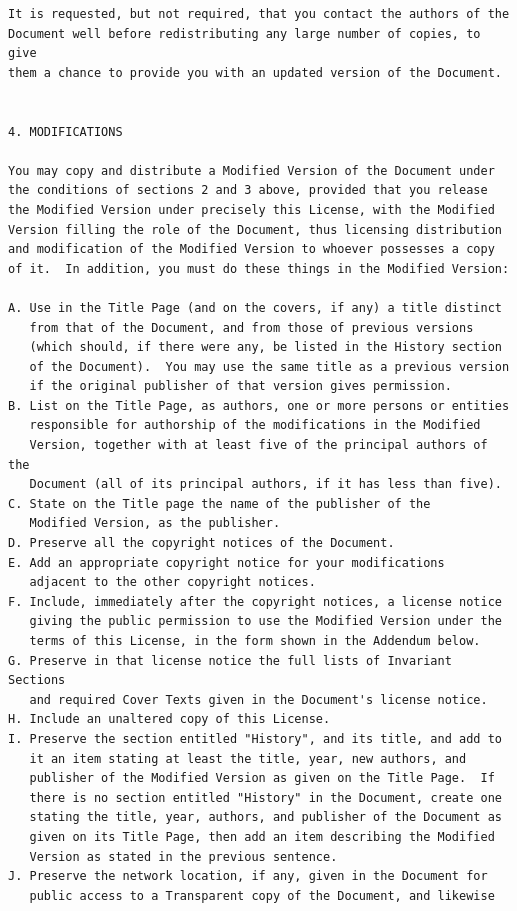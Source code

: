 \documentclass[12pt]{report}
\begin{document}
\begin{verbatim}
It is requested, but not required, that you contact the authors of the
Document well before redistributing any large number of copies, to give
them a chance to provide you with an updated version of the Document.


4. MODIFICATIONS

You may copy and distribute a Modified Version of the Document under
the conditions of sections 2 and 3 above, provided that you release
the Modified Version under precisely this License, with the Modified
Version filling the role of the Document, thus licensing distribution
and modification of the Modified Version to whoever possesses a copy
of it.  In addition, you must do these things in the Modified Version:

A. Use in the Title Page (and on the covers, if any) a title distinct
   from that of the Document, and from those of previous versions
   (which should, if there were any, be listed in the History section
   of the Document).  You may use the same title as a previous version
   if the original publisher of that version gives permission.
B. List on the Title Page, as authors, one or more persons or entities
   responsible for authorship of the modifications in the Modified
   Version, together with at least five of the principal authors of the
   Document (all of its principal authors, if it has less than five).
C. State on the Title page the name of the publisher of the
   Modified Version, as the publisher.
D. Preserve all the copyright notices of the Document.
E. Add an appropriate copyright notice for your modifications
   adjacent to the other copyright notices.
F. Include, immediately after the copyright notices, a license notice
   giving the public permission to use the Modified Version under the
   terms of this License, in the form shown in the Addendum below.
G. Preserve in that license notice the full lists of Invariant Sections
   and required Cover Texts given in the Document's license notice.
H. Include an unaltered copy of this License.
I. Preserve the section entitled "History", and its title, and add to
   it an item stating at least the title, year, new authors, and
   publisher of the Modified Version as given on the Title Page.  If
   there is no section entitled "History" in the Document, create one
   stating the title, year, authors, and publisher of the Document as
   given on its Title Page, then add an item describing the Modified
   Version as stated in the previous sentence.
J. Preserve the network location, if any, given in the Document for
   public access to a Transparent copy of the Document, and likewise

\end{verbatim}
\end{document}
